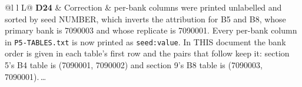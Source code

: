 \begin{xltabular}{\linewidth}{@{}l l L@{}}
\textbf{D24} & Correction & per-bank columns were printed unlabelled and sorted by seed NUMBER, which inverts the attribution for B5 and B8, whose primary bank is 7090003 and whose replicate is 7090001. Every per-bank column in \texttt{P5-TABLES.txt} is now printed as \texttt{seed:value}. In THIS document the bank order is given in each table's first row and the pairs that follow keep it: section 5's B4 table is (7090001, 7090002) and section 9's B8 table is (7090003, 7090001).\,\ldots \\
\end{xltabular}

